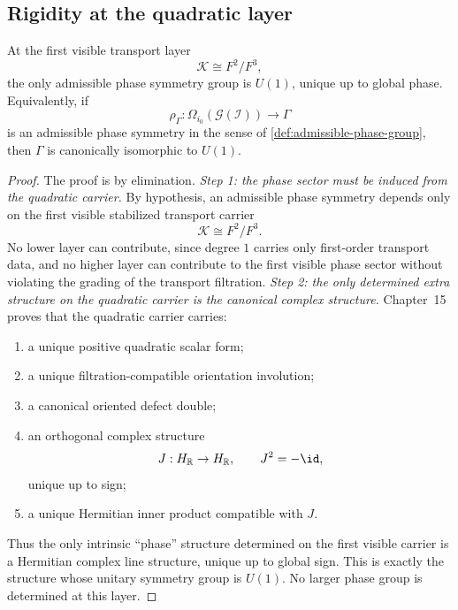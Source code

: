 \subsection{Rigidity at the quadratic layer}
\begin{theorem}
	\label{thm:quadratic-phase-rigidity}
	At the first visible transport layer
	\[
		\mathcal K\cong F^2/F^3,
	\]
	the only admissible phase symmetry group is \(U(1)\), unique up to
	global phase.
	Equivalently, if
	\[
		\rho_\Gamma:\Omega_{i_0}(\mathcal G(\mathcal I))\to \Gamma
	\]
	is an admissible phase symmetry in the sense of
	\cref{def:admissible-phase-group}, then \(\Gamma\) is canonically
	isomorphic to \(U(1)\).
\end{theorem}
\begin{proof}
	The proof is by elimination.
	\smallskip
	\noindent\emph{Step 1: the phase sector must be induced from the quadratic carrier.}
	By hypothesis, an admissible phase symmetry depends only on the first
	visible stabilized transport carrier
	\[
		\mathcal K\cong F^2/F^3.
	\]
	No lower layer can contribute, since degree $1$ carries only first-order
	transport data, and no higher layer can contribute to the first visible
	phase sector without violating the grading of the transport filtration.
	\smallskip
	\noindent\emph{Step 2: the only determined extra structure on the quadratic carrier is the
		canonical complex structure.}
	Chapter~15 proves that the quadratic carrier carries:
	\begin{enumerate}
		\item a unique positive quadratic scalar form;
		\item a unique filtration-compatible orientation involution;
		\item a canonical oriented defect double;
		\item an orthogonal complex structure
		      \[
			      J: H_{\mathbb R}\to H_{\mathbb R},\qquad J^2=-\id,
		      \]
		      unique up to sign;
		\item a unique Hermitian inner product compatible with $J$.
	\end{enumerate}
	Thus the only intrinsic ``phase'' structure determined on the first visible
	carrier is a Hermitian complex line structure, unique up to global sign.
	This is exactly the structure whose unitary symmetry group is \(U(1)\).
	No larger phase group is determined at this layer. \qedhere
\end{proof}
